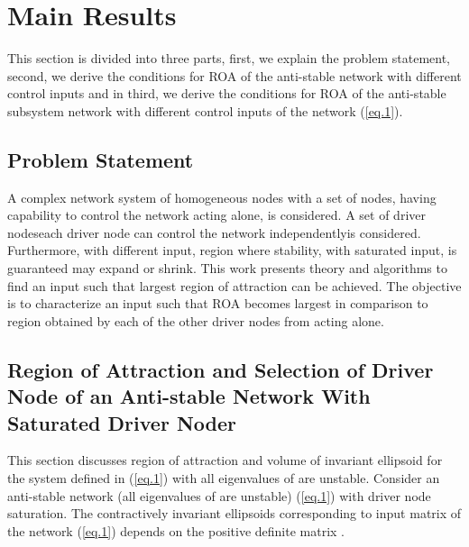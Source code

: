 \documentclass[conference]{IEEEtran}
\begin{document}
\section{Main Results}
This section is divided into three parts, first, we explain the problem statement, second, we derive the conditions for ROA of the anti-stable network with different control inputs and in third, we derive the conditions for ROA of the anti-stable subsystem network with different control inputs of the network (\ref{eq.1}).
\subsection{Problem Statement}
A complex network system of homogeneous nodes with a set of nodes, having capability to control the network acting alone, is considered. A set of driver nodes\textemdash each driver node can control the network independently\textemdash is considered. Furthermore, with different input, region where stability, with saturated input, is guaranteed may expand or shrink. This work presents theory and algorithms to find an input such that largest region of attraction can be achieved. The objective is to characterize an input such that ROA becomes largest in comparison to region obtained by each of the other driver nodes from  acting alone.

\subsection{Region of Attraction and Selection of Driver Node of an Anti-stable Network With Saturated Driver Noder}
This section discusses region of attraction and volume of invariant ellipsoid for the system defined in (\ref{eq.1}) with all eigenvalues of  are unstable.
Consider an anti-stable network (all eigenvalues of  are unstable) (\ref{eq.1}) with driver node saturation. The contractively invariant ellipsoids corresponding to input matrix  of the network (\ref{eq.1}) depends on the positive definite matrix .
\end{document}
